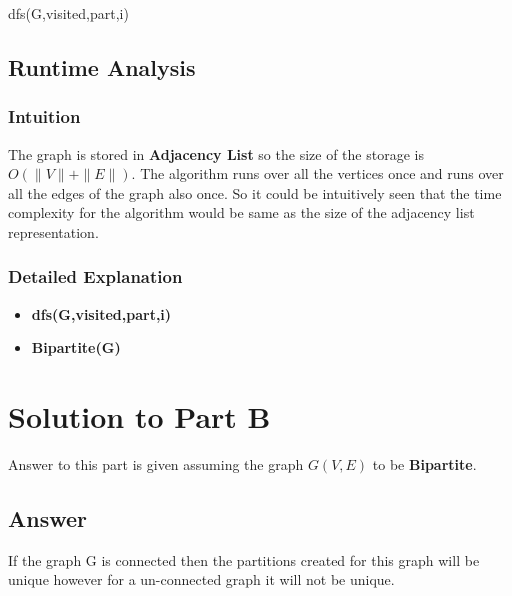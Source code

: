 \documentclass[20pt]{article}
\begin{document}
\begin{algorithm}

	
	\caption{dfs(G,visited,part,i)}
\end{algorithm}

\subsection{Runtime Analysis}
\subsubsection{Intuition}
The graph is stored in \textbf{Adjacency List} so the size of the storage is \\ 
\textbf{$O(\|V\|+\|E\|)$}. The algorithm runs over all the vertices once and runs over all the edges of the graph also once. So it could be intuitively seen that the time complexity for the algorithm would be same as the size of the adjacency list representation.
\subsubsection{Detailed Explanation}
\begin{itemize}
\item \textbf{dfs(G,visited,part,i)} \\

\item \textbf{Bipartite(G)} \\

\end{itemize}

\newpage
\section{Solution to Part B}
Answer to this part is given assuming the graph $G(V,E)$ to be \textbf{Bipartite}.
\subsection{Answer}
If the graph G is connected then the partitions created for this graph will be unique however for a un-connected graph it will not be unique.
\end{document}
